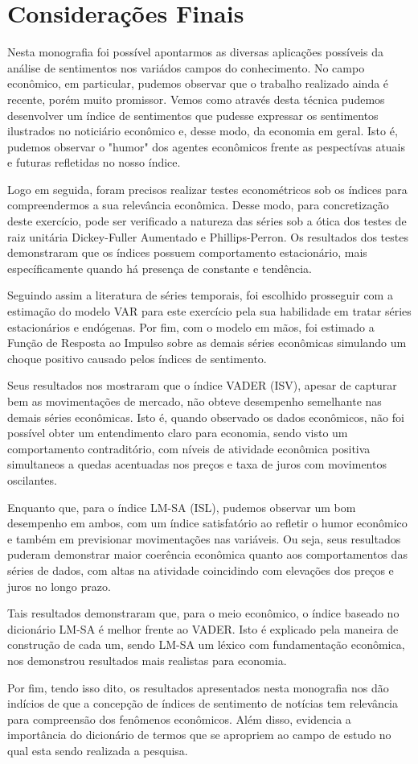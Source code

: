 \chapter{Considerações Finais}

Nesta monografia foi possível apontarmos as diversas aplicações possíveis da análise de sentimentos nos variádos campos do conhecimento. No campo econômico, em particular, pudemos observar que o trabalho realizado ainda é recente, porém muito promissor. Vemos como através desta técnica pudemos desenvolver um índice de sentimentos que pudesse expressar os sentimentos ilustrados no noticiário econômico e, desse modo, da economia em geral. Isto é, pudemos observar o "humor" dos agentes econômicos frente as pespectívas atuais e futuras refletidas no nosso índice.

Logo em seguida, foram precisos realizar testes econométricos sob os índices para compreendermos a sua relevância econômica. Desse modo, para concretização deste exercício, pode ser verificado a natureza das séries sob a ótica dos testes de raiz unitária Dickey-Fuller Aumentado e Phillips-Perron. Os resultados dos testes demonstraram que os índices possuem comportamento estacionário, mais específicamente quando há presença de constante e tendência.

Seguindo assim a literatura de séries temporais, foi escolhido prosseguir com a estimação do modelo VAR para este exercício pela sua habilidade em tratar séries estacionários e endógenas. Por fim, com o modelo em mãos, foi estimado a Função de Resposta ao Impulso sobre as demais séries econômicas simulando um choque positivo causado pelos índices de sentimento. 

Seus resultados nos mostraram que o índice VADER (ISV), apesar de capturar bem as movimentações de mercado, não obteve desempenho semelhante nas demais séries econômicas. Isto é, quando observado os dados econômicos, não foi possível obter um entendimento claro para economia, sendo visto um comportamento contraditório, com níveis de atividade econômica positiva simultaneos a quedas acentuadas nos preços e taxa de juros com movimentos oscilantes.

Enquanto que, para o índice LM-SA (ISL), pudemos observar um bom desempenho em ambos, com um índice satisfatório ao refletir o humor econômico e também em previsionar movimentações nas variáveis. Ou seja, seus resultados puderam demonstrar maior coerência econômica quanto aos comportamentos das séries de dados, com altas na atividade coincidindo com elevações dos preços e juros no longo prazo. 

Tais resultados demonstraram que, para o meio econômico, o índice baseado no dicionário LM-SA é melhor frente ao VADER. Isto é explicado pela maneira de construção de cada um, sendo LM-SA um léxico com fundamentação econômica, nos demonstrou resultados mais realistas para economia.

Por fim, tendo isso dito, os resultados apresentados nesta monografia nos dão indícios de que a concepção de índices de sentimento de notícias tem relevância para compreensão dos fenômenos econômicos. Além disso, evidencia a importância do dicionário de termos que se apropriem ao campo de estudo no qual esta sendo realizada a pesquisa.
